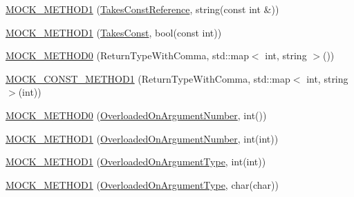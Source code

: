 \begin{DoxyCompactItemize}
\item 
\hyperlink{classtesting_1_1gmock__generated__function__mockers__test_1_1MockFoo_a605c84c3375d02769b0288d7637b552f}{M\+O\+C\+K\+\_\+\+M\+E\+T\+H\+O\+D1} (\hyperlink{classtesting_1_1gmock__generated__function__mockers__test_1_1FooInterface_a3db03c9698ecddfc62f2a1ed2f3c32c2}{Takes\+Const\+Reference}, string(const int \&))
\item 
\hyperlink{classtesting_1_1gmock__generated__function__mockers__test_1_1MockFoo_a7b548776b156454bcddecaca6294c52f}{M\+O\+C\+K\+\_\+\+M\+E\+T\+H\+O\+D1} (\hyperlink{classtesting_1_1gmock__generated__function__mockers__test_1_1FooInterface_a8c53e87edf0b9da878e5259f02b7f5dc}{Takes\+Const}, bool(const int))
\item 
\hyperlink{classtesting_1_1gmock__generated__function__mockers__test_1_1MockFoo_a5fb8c71ba44b97fbc8945905a9835215}{M\+O\+C\+K\+\_\+\+M\+E\+T\+H\+O\+D0} (Return\+Type\+With\+Comma, std\+::map$<$ int, string $>$())
\item 
\hyperlink{classtesting_1_1gmock__generated__function__mockers__test_1_1MockFoo_a777b7b57ac125e2fe868e6cda46833fc}{M\+O\+C\+K\+\_\+\+C\+O\+N\+S\+T\+\_\+\+M\+E\+T\+H\+O\+D1} (Return\+Type\+With\+Comma, std\+::map$<$ int, string $>$(int))
\item 
\hyperlink{classtesting_1_1gmock__generated__function__mockers__test_1_1MockFoo_a1666c565d1b48b351a1a453f6f87ff22}{M\+O\+C\+K\+\_\+\+M\+E\+T\+H\+O\+D0} (\hyperlink{classtesting_1_1gmock__generated__function__mockers__test_1_1FooInterface_ae9e86ac64fa9acedfb1fa747174c7f43}{Overloaded\+On\+Argument\+Number}, int())
\item 
\hyperlink{classtesting_1_1gmock__generated__function__mockers__test_1_1MockFoo_a45014dba5c27e9d59af3a94e0d324096}{M\+O\+C\+K\+\_\+\+M\+E\+T\+H\+O\+D1} (\hyperlink{classtesting_1_1gmock__generated__function__mockers__test_1_1FooInterface_ae9e86ac64fa9acedfb1fa747174c7f43}{Overloaded\+On\+Argument\+Number}, int(int))
\item 
\hyperlink{classtesting_1_1gmock__generated__function__mockers__test_1_1MockFoo_ad900c5945fc52a0a95ca1480207c7add}{M\+O\+C\+K\+\_\+\+M\+E\+T\+H\+O\+D1} (\hyperlink{classtesting_1_1gmock__generated__function__mockers__test_1_1FooInterface_ad9cc9a11570403fb8378ed6620892ec6}{Overloaded\+On\+Argument\+Type}, int(int))
\item 
\hyperlink{classtesting_1_1gmock__generated__function__mockers__test_1_1MockFoo_ab4b323a9c06a48c1116d55419195c1a6}{M\+O\+C\+K\+\_\+\+M\+E\+T\+H\+O\+D1} (\hyperlink{classtesting_1_1gmock__generated__function__mockers__test_1_1FooInterface_ad9cc9a11570403fb8378ed6620892ec6}{Overloaded\+On\+Argument\+Type}, char(char))

\end{DoxyCompactItemize}
